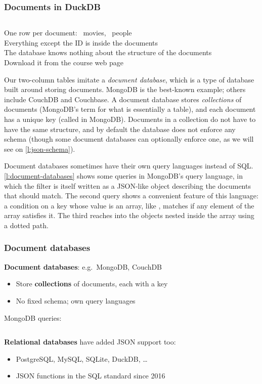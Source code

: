 \begin{frame}
    \label{s:json-tables}
    \frametitle{Documents in DuckDB}
    \inputminted[fontsize=\footnotesize]{sql}{code/json-tables.sql}
    \vspace{0.6em}
    One row per document: \jsonmovies\ movies, \jsonpeople\ people\\[0.5em]
    Everything except the ID is inside the documents\\[0.5em]
    The database knows nothing about the structure of the documents\\[0.5em]
    Download it from the course web page
\end{frame}
\label{l:json-tables}

Our two-column tables imitate a \emph{document database}, which is a type of database built around storing documents.
MongoDB is the best-known example; others include CouchDB and Couchbase.
A document database stores \emph{collections} of documents (MongoDB's term for what is essentially a table), and each document has a unique key (called  in MongoDB).
Documents in a collection do not have to have the same structure, and by default the database does not enforce any schema (though some document databases can optionally enforce one, as we will see on \autoref{l:json-schema}).

Document databases sometimes have their own query languages instead of SQL.
\autoref{l:document-databases} shows some queries in MongoDB's query language, in which the filter is itself written as a JSON-like object describing the documents that should match.
The second query shows a convenient feature of this language: a condition on a key whose value is an array, like , matches if any element of the array satisfies it.
The third reaches into the objects nested inside the  array using a dotted path.

\begin{frame}
    \label{s:document-databases}
    \frametitle{Document databases}
    \textbf{Document databases}: e.g.\ MongoDB, CouchDB
    \begin{itemize}
        \item Store \textbf{collections} of documents, each with a key
        \item No fixed schema; own query languages\\[0.5em]
    \end{itemize}
    MongoDB queries:
    \inputminted[fontsize=\footnotesize]{javascript}{code/mongodb-find.js}
    \vspace{0.5em}\pause
    \textbf{Relational databases} have added JSON support too:
    \begin{itemize}
        \item PostgreSQL, MySQL, SQLite, DuckDB, \dots
        \item JSON functions in the SQL standard since 2016
    \end{itemize}
\end{frame}
\label{l:document-databases}

